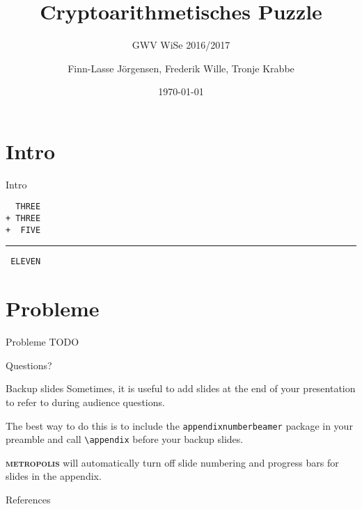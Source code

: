 \documentclass[10pt]{beamer}
\title{Cryptoarithmetisches Puzzle}
\subtitle{GWV WiSe 2016/2017}
\date{\today}
\date{}
\author{Finn-Lasse Jörgensen, Frederik Wille, Tronje Krabbe}
\institute{UHH}
\newcommand{\themename}{\textbf{\textsc{metropolis}}\xspace}
\begin{document}
\maketitle


\section{Intro}

\begin{frame}[fragile]{Intro}

\begin{center}
    \begin{verbatim}  THREE
+ THREE
+  FIVE\end{verbatim}
\rule{30cm}{.1pt}
\begin{verbatim} ELEVEN\end{verbatim}
\end{center}

\end{frame}

\section{Probleme}

\begin{frame}[fragile]{Probleme}
    TODO
\end{frame}



\begin{frame}[standout]
    Questions?
\end{frame}

\appendix

\begin{frame}[fragile]{Backup slides}
    Sometimes, it is useful to add slides at the end of your presentation to
    refer to during audience questions.

    The best way to do this is to include the \verb|appendixnumberbeamer|
    package in your preamble and call \verb|\appendix| before your backup slides.

    \themename will automatically turn off slide numbering and progress bars for
    slides in the appendix.
\end{frame}

\begin{frame}[allowframebreaks]{References}

    
    

\end{frame}
\end{document}
